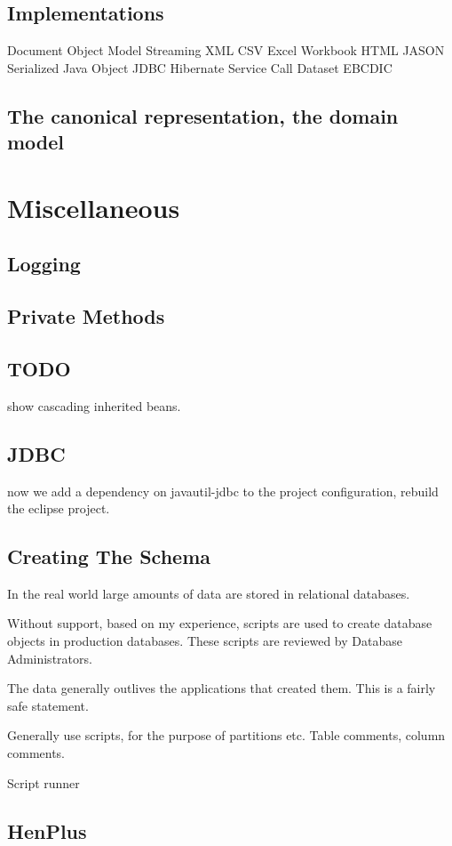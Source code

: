 \documentclass[a4paper,10pt]{book}
\begin{document}
\section{Implementations}
Document Object Model
Streaming XML
CSV
Excel Workbook
HTML
JASON
Serialized Java Object
JDBC
Hibernate
Service Call
Dataset
EBCDIC

\section{The canonical representation, the domain model}

\chapter{Miscellaneous}
\section{Logging}

\section{Private Methods}
\section{TODO}
show cascading inherited beans.

\section{JDBC}
now we add a dependency on javautil-jdbc to the project configuration, rebuild the eclipse project.

\section{Creating The Schema}
In the real world large amounts of data are stored in relational databases. 

Without support, based on my experience, scripts are used to create database objects in production
databases.  These scripts are reviewed by Database Administrators.

The data generally outlives the applications that created them. This is a fairly safe statement.

Generally use scripts, for the purpose of partitions etc.  Table comments, column comments.

Script runner
\section{HenPlus}
\end{document}
